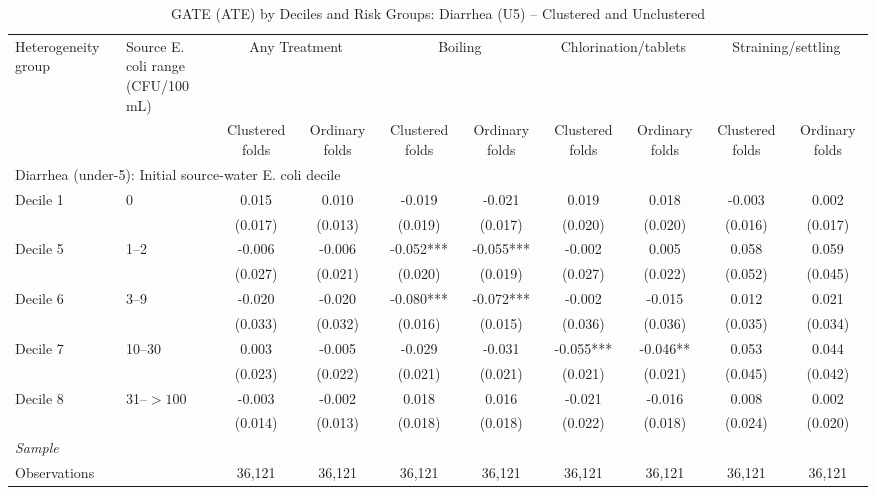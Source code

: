 \begin{landscape}
\begin{table}[p]
\centering
\caption{GATE (ATE) by Deciles and Risk Groups: Diarrhea (U5) -- Clustered and Unclustered}
\label{tab:table_gate_appendix-diarrhea}
\scriptsize\setlength{\tabcolsep}{4pt}
\begin{adjustbox}{max width=\linewidth, center}
\begin{tabular}{llcccccccc}
\toprule
Heterogeneity group & \shortstack{Source E. coli range\\(CFU/100 mL)} & \multicolumn{2}{c}{Any Treatment} & \multicolumn{2}{c}{Boiling} & \multicolumn{2}{c}{Chlorination/tablets} & \multicolumn{2}{c}{Straining/settling} \\
 &  & Clustered folds & Ordinary folds & Clustered folds & Ordinary folds & Clustered folds & Ordinary folds & Clustered folds & Ordinary folds \\
\midrule
\multicolumn{10}{l}{Diarrhea (under-5): Initial source-water E. coli decile} \\
Decile 1 & 0 & 0.015 & 0.010 & -0.019 & -0.021 & 0.019 & 0.018 & -0.003 & 0.002 \\
 &  & (0.017) & (0.013) & (0.019) & (0.017) & (0.020) & (0.020) & (0.016) & (0.017) \\
Decile 5 & 1--2 & -0.006 & -0.006 & -0.052*** & -0.055*** & -0.002 & 0.005 & 0.058 & 0.059 \\
 &  & (0.027) & (0.021) & (0.020) & (0.019) & (0.027) & (0.022) & (0.052) & (0.045) \\
Decile 6 & 3--9 & -0.020 & -0.020 & -0.080*** & -0.072*** & -0.002 & -0.015 & 0.012 & 0.021 \\
 &  & (0.033) & (0.032) & (0.016) & (0.015) & (0.036) & (0.036) & (0.035) & (0.034) \\
Decile 7 & 10--30 & 0.003 & -0.005 & -0.029 & -0.031 & -0.055*** & -0.046** & 0.053 & 0.044 \\
 &  & (0.023) & (0.022) & (0.021) & (0.021) & (0.021) & (0.021) & (0.045) & (0.042) \\
Decile 8 & 31--$>100$ & -0.003 & -0.002 & 0.018 & 0.016 & -0.021 & -0.016 & 0.008 & 0.002 \\
 &  & (0.014) & (0.013) & (0.018) & (0.018) & (0.022) & (0.018) & (0.024) & (0.020) \\
\multicolumn{10}{l}{\textit{Sample}} \\
\quad Observations &  & 36,121 & 36,121 & 36,121 & 36,121 & 36,121 & 36,121 & 36,121 & 36,121 \\

\end{tabular}
\end{adjustbox}
\end{table}
\end{landscape}
